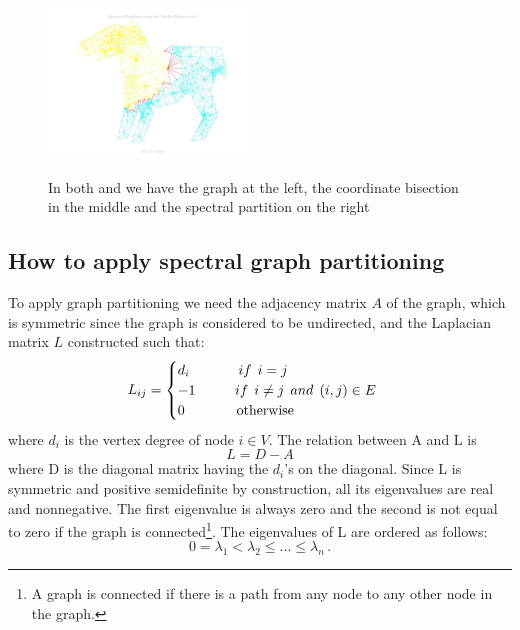 \documentclass[]{usiinfbachelorproject}
\newcommand\tab[1][1cm]{\hspace*{#1}}
\begin{document}
\begin{figure}[ht]
{		\includegraphics[height=4cm]{img/g12.jpg}
		\label{fig:cororsp}
	}
	\caption{In both  and  we have the graph at the left, the coordinate bisection in the middle and the spectral partition on the right}
	\label{fig:partitioning}
\end{figure}

\subsection{How to apply spectral graph partitioning}
To apply graph partitioning we need the adjacency matrix $A$ of the graph, which is symmetric since the graph is considered to be undirected, and the Laplacian matrix $L$ constructed such that: 
\begin{equation}\notag
L_{ij} = 
\begin{cases}
d_i \tab \:\:\: if \:\: i=j \\
-1 \tab if \:\: i \neq j \:\: and \: \: (i,j) \in E \\
0 \tab \:\:\:\: \text{otherwise}
\end{cases}
\end{equation}
where $d_i$ is the vertex degree of node $i \in V$.
The relation between A and L is
\begin{equation}
L = D - A
\end{equation}
where D is the diagonal matrix having the $d_i$'s on the diagonal. Since L is symmetric and positive semidefinite by construction, all its eigenvalues are real and nonnegative. The first eigenvalue is always zero and the second is not equal to zero if the graph is connected\footnote{A graph is connected if there is a path from any node to any other node in the graph.}.
The eigenvalues of L are ordered as follows:
\begin{equation}
0 = \lambda_1 < \lambda_2 \leq ... \leq \lambda_n \,.
\end{equation}
\end{document}
